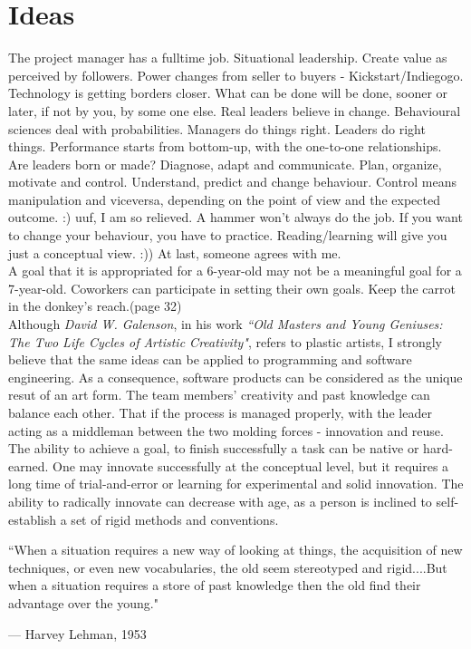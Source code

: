 \documentclass[conference]{IEEEtran}
\begin{document}
\section{Ideas}
The project manager has a fulltime job.
Situational leadership.
Create value as perceived by followers.
Power changes from seller to buyers - Kickstart/Indiegogo.
Technology is getting borders closer.
What can be done will be done, sooner or later, if not by you, by some one else.
Real leaders believe in change.
Behavioural sciences deal with probabilities.
Managers do things right. Leaders do right things.
Performance starts from bottom-up, with the one-to-one relationships.
Are leaders born or made?
Diagnose, adapt and communicate.
Plan, organize, motivate and control.
Understand, predict and change behaviour. Control means manipulation and viceversa, depending on the point of view and the expected outcome. :) uuf, I am so relieved.
A hammer won't always do the job.
If you want to change your behaviour, you have to practice. Reading/learning will give you just a conceptual view. :)) At last, someone agrees with me.\cite{IEEEhowto:fulltime}\\
A goal that it is appropriated for a 6-year-old may not be a meaningful goal for a 7-year-old. Coworkers can participate in setting their own goals.
Keep the carrot in the donkey's reach.(page 32)
\\
\indent
Although \emph{David W. Galenson}, in his work \emph{``Old Masters and Young Geniuses: The Two Life Cycles of Artistic Creativity"}, refers to plastic artists, I strongly believe that the same ideas can be applied to programming and software engineering. As a consequence, software products can be considered as the unique resut of an art form. The team members' creativity and past knowledge can balance each other. That if the process is managed properly, with the leader acting as a middleman between the two molding forces - innovation and reuse. The ability to achieve a goal, to finish successfully a task can be native or hard-earned. One may innovate successfully at the conceptual level, but it requires a long time of trial-and-error or learning for experimental and solid innovation. The ability to radically innovate can decrease with age, as a person is inclined to self-establish a set of rigid methods and conventions.\cite{IEEEhowto:oldvsyoung}

\epigraph{``When a situation requires a new way of looking at things, the acquisition of new techniques, or even new vocabularies, the old seem stereotyped and rigid....But when a situation requires a store of past knowledge then the old find their advantage over the young."}{--- \textup{Harvey Lehman}, 1953
}
\end{document}
